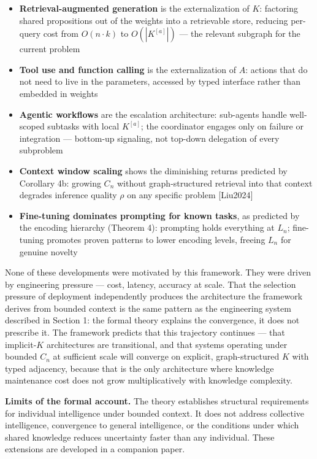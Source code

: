\documentclass[
]{article}
\providecommand{\tightlist}{%
  \setlength{\itemsep}{0pt}\setlength{\parskip}{0pt}}
\begin{document}
\begin{itemize}
\tightlist
\item
  \textbf{Retrieval-augmented generation} is the externalization of
  \(K\): factoring shared propositions out of the weights into a
  retrievable store, reducing per-query cost from \(O(n \cdot k)\) to
  \(O(|K^{[a]}|)\) --- the relevant subgraph for the current problem
\item
  \textbf{Tool use and function calling} is the externalization of
  \(A\): actions that do not need to live in the parameters, accessed by
  typed interface rather than embedded in weights
\item
  \textbf{Agentic workflows} are the escalation architecture: sub-agents
  handle well-scoped subtasks with local \(K^{[a]}\); the coordinator
  engages only on failure or integration --- bottom-up signaling, not
  top-down delegation of every subproblem
\item
  \textbf{Context window scaling} shows the diminishing returns predicted
  by Corollary 4b: growing \(C_n\) without graph-structured retrieval
  into that context degrades inference quality \(\rho\) on any specific
  problem {[}Liu2024{]}
\item
  \textbf{Fine-tuning dominates prompting for known tasks}, as predicted
  by the encoding hierarchy (Theorem 4): prompting holds everything at
  \(L_n\); fine-tuning promotes proven patterns to lower encoding levels,
  freeing \(L_n\) for genuine novelty
\end{itemize}

None of these developments were motivated by this framework. They were
driven by engineering pressure --- cost, latency, accuracy at scale.
That the selection pressure of deployment independently produces the
architecture the framework derives from bounded context is the same
pattern as the engineering system described in Section 1: the formal
theory explains the convergence, it does not prescribe it. The framework
predicts that this trajectory continues --- that implicit-\(K\)
architectures are transitional, and that systems operating under bounded
\(C_n\) at sufficient scale will converge on explicit, graph-structured
\(K\) with typed adjacency, because that is the only architecture where
knowledge maintenance cost does not grow multiplicatively with knowledge
complexity.

\textbf{Limits of the formal account.} The theory establishes structural
requirements for individual intelligence under bounded context. It does
not address collective intelligence, convergence to general intelligence,
or the conditions under which shared knowledge reduces uncertainty faster
than any individual. These extensions are developed in a companion paper.
\end{document}
